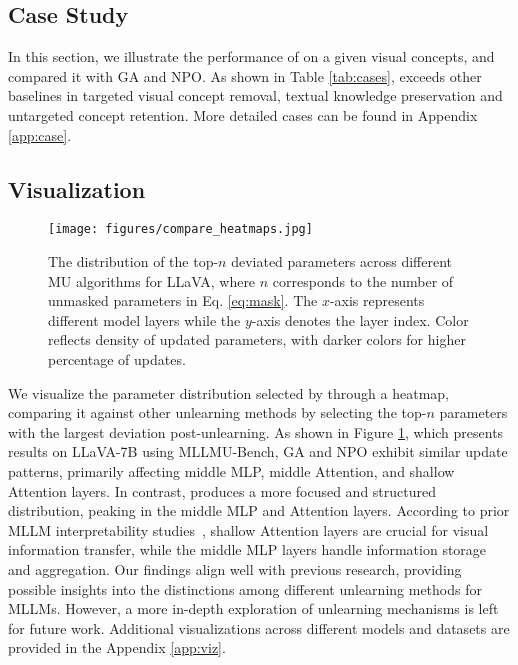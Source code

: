 \subsection{Case Study}

In this section, we illustrate the performance of \method on a given visual concepts, and compared it with GA and NPO. As shown in Table \ref{tab:cases}, \method exceeds other baselines in targeted visual concept removal, textual knowledge preservation and untargeted concept retention. More detailed cases can be found in Appendix \ref{app:case}.






\subsection{Visualization}
\begin{figure}[!t]
\centering
\texttt{[image: figures/compare\_heatmaps.jpg]}
\vspace{-0.1in}
\caption{ 
The distribution of the top-$n$ deviated parameters across different MU algorithms for LLaVA, where $n$ corresponds to the number of unmasked parameters in Eq. \ref{eq:mask}. The $x$-axis represents different model layers while the $y$-axis denotes the layer index. Color reflects density of updated parameters, with darker colors for higher percentage of updates.}
\vspace{-0.1in}
\label{fig:heatmap}
\end{figure}
We visualize the parameter distribution selected by \method through a heatmap, comparing it against other unlearning methods by selecting the top-$n$ parameters with the largest deviation post-unlearning. As shown in Figure \ref{fig:heatmap}, which presents results on LLaVA-7B using MLLMU-Bench, GA and NPO exhibit similar update patterns, primarily affecting middle MLP, middle Attention, and shallow Attention layers. In contrast, \method produces a more focused and structured distribution, peaking in the middle MLP and Attention layers. According to prior MLLM interpretability studies~\cite{basu2024understanding,yu2024understanding}, shallow Attention layers are crucial for visual information transfer, while the middle MLP layers handle information storage and aggregation. Our findings align well with previous research, providing possible insights into the distinctions among different unlearning methods for MLLMs. However, a more in-depth exploration of unlearning mechanisms is left for future work. Additional visualizations across different models and datasets are provided in the Appendix \ref{app:viz}.
